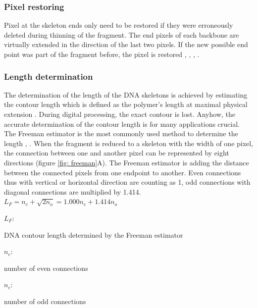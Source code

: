 \documentclass{article}
\begin{document}
\subsubsection{Pixel restoring}

Pixel at the skeleton ends only need to be restored if they were erroneously deleted during thinning of the fragment. The end pixels of each backbone are virtually extended in the direction of the last two pixels. If the new possible end point was part of the fragment before, the pixel is restored \cite{spisz1998automated}, \cite{ficarra2005automated}, \cite{ficarra2002automated}, \cite{ficarra2005automatic}.



\subsubsection{Length determination}

The determination of the length of the DNA skeletons is achieved by estimating the contour length which is defined as the polymer’s length at maximal physical extension \cite{rivetti2001accurate}.  During digital processing, the exact contour is lost. Anyhow, the accurate determination of the contour length is for many applications crucial. The Freeman estimator is the most commonly used method to determine the length \cite{spisz1998automated}, \cite{marturelliautomated}. When the fragment is reduced to a skeleton with the width of one pixel, the connection between one and another pixel can be represented by eight directions (figure \ref{fig: freeman}A). The Freeman estimator is adding the distance between the connected pixels from one endpoint to another. Even connections thus with vertical or horizontal direction are counting as 1, odd connections with diagonal connections are multiplied by 1.414. \\

$ L_{F} = n_{e} + \sqrt{2n_{o}} = 1.000n_{e} + 1.414n_{o}  $ 

\hspace{0,2cm}
 
$ L_{F}$: \begin{footnotesize} 
DNA contour length determined by the Freeman estimator
\end{footnotesize}  

$ n_{e}$: \begin{footnotesize} 
 number of even connections
\end{footnotesize} 
 
$ n_{c}$: \begin{footnotesize} 
 number of odd connections
\end{footnotesize}  \\
\end{document}
